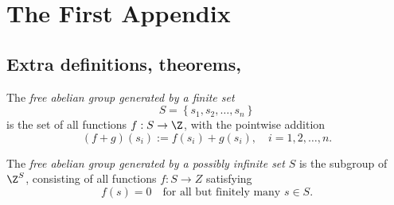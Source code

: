 \chapter{The First Appendix}

\section{Extra definitions, theorems, \etc}

\begin{defn} \label{ap:abeliandef}
	The \textit{free abelian group generated by a finite set}
	$$ S = \left\{s_1, s_2, \ldots, s_n \right\} $$
	is the set of all functions $ f : S \rightarrow \Z$, with the pointwise addition
		$$ (f + g)(s_i) := f(s_i) + g(s_i), \quad i = 1, 2, \ldots, n . $$
\end{defn}

\begin{defn} \label{ap:freeabeliandef}
	The \textit{free abelian group generated by a possibly infinite set} $S$ is the subgroup of $\Z^S$, consisting of all functions $f : S \rightarrow Z$ satisfying
	$$ f(s) = 0 \quad \text{for all but finitely many } s \in S. $$
\end{defn}